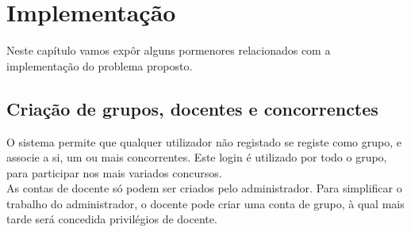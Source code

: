 \chapter{Implementação} \label{chap implem}

Neste capítulo vamos expôr alguns pormenores relacionados com a implementação do problema proposto.

\section{Criação de grupos, docentes e concorrenctes}\label{sec gdc}
O sistema permite que qualquer utilizador não registado se registe como grupo, e associe a si, um ou mais concorrentes. Este login
é utilizado por todo o grupo, para participar nos mais variados concursos.\\
As contas de docente só podem ser criados pelo administrador. Para simplificar o trabalho do administrador, o docente pode criar 
uma conta de grupo, à qual mais tarde será concedida privilégios de docente.



